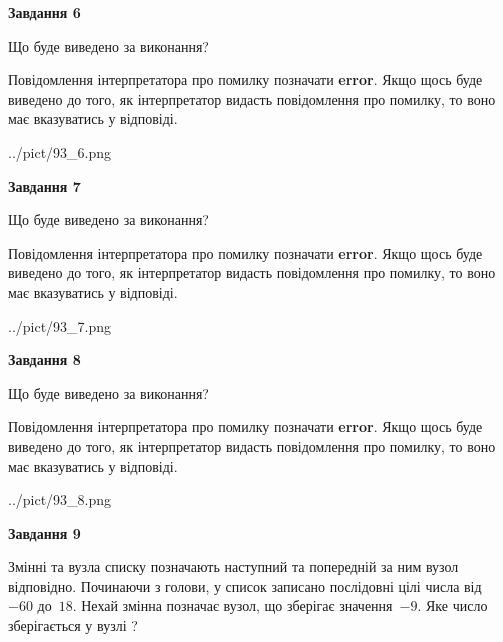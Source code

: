 \documentclass[12pt, ukrainian]{article}
\begin{document}
{\begin {large}
{\begin {center}\textbf{Завдання 6}\end {center}}\par
Що буде виведено за виконання?

Повідомлення інтерпретатора про помилку позначати \textbf{error}.
Якщо щось буде виведено до того, як інтерпретатор видасть повідомлення про помилку, 
то воно має вказуватись у відповіді. \par


\begin{center}
	{../pict/93_6.png}
\end{center}
\newpage

{\begin {center}\textbf{Завдання 7}\end {center}}\par
Що буде виведено за виконання?

Повідомлення інтерпретатора про помилку позначати \textbf{error}.
Якщо щось буде виведено до того, як інтерпретатор видасть повідомлення про помилку, 
то воно має вказуватись у відповіді. \par


\begin{center}
	{../pict/93_7.png}
\end{center}
\newpage

{\begin {center}\textbf{Завдання 8}\end {center}}\par
Що буде виведено за виконання?

Повідомлення інтерпретатора про помилку позначати \textbf{error}.
Якщо щось буде виведено до того, як інтерпретатор видасть повідомлення про помилку, 
то воно має вказуватись у відповіді. \par


\begin{center}
	{../pict/93_8.png}
\end{center}
\newpage

{\begin {center}\textbf{Завдання 9}\end {center}}\par
Змінні  та  вузла списку позначають наступний та попередній за ним вузол відповідно. Починаючи з голови, у список записано послідовні цілі числа від~$-60$ до~$18$. Нехай змінна  позначає вузол, що зберігає значення~$-9$.
Яке число зберігається у вузлі  ?\par
\newpage


\end{large}}
\end{document}
